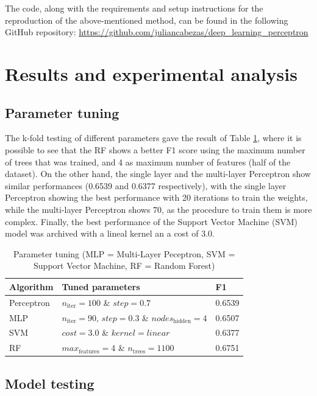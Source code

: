 \documentclass[10pt,twocolumn,letterpaper]{article}
\begin{document}
The code, along with the requirements and setup instructions for the reproduction of the above-mentioned method, can be found in the following GitHub repository: \url{https://github.com/juliancabezas/deep_learning_perceptron} 

\section{Results and experimental analysis}

\subsection{Parameter tuning}

The k-fold testing of different parameters gave the result of Table \ref{table:tuning}, where it is possible to see that the RF shows a better F1 score using the maximum number of trees that was trained, and 4 as maximum number of features (half of the dataset). On the other hand, the single layer and the multi-layer Perceptron show similar performances (0.6539 and 0.6377 respectively), with the single layer Perceptron showing the best performance with 20 iterations to train the weights, while the multi-layer Perceptron shows 70, as the procedure to train them is more complex. Finally, the best performance of the Support Vector Machine (SVM) model was archived with a lineal kernel an a cost of 3.0.

\begin{table}[h]
	\begin{center}
		\begin{tabular}{|p{1.6cm}|p{4.3cm}|p{1cm}|}
			\hline
			Algorithm & Tuned parameters & F1 \\
			\hline\hline
			Perceptron & $n_\mathrm{iter} = 100$ \& $step = 0.7$ & 0.6539 \\
			MLP & $n_\mathrm{iter} = 90$, $step = 0.3$ \& $nodes_\mathrm{hidden} = 4$ & 0.6507 \\
			SVM & $cost = 3.0$ \& $kernel = linear$ & 0.6377 \\
			RF & $max_\mathrm{features} = 4$ \& $n_\mathrm{trees} = 1100$ & 0.6751 \\
			\hline
		\end{tabular}
	\end{center}
	\caption{Parameter tuning (MLP = Multi-Layer Peceptron, SVM = Support Vector Machine, RF = Random Forest)}
	\label{table:tuning}
\end{table}


\subsection{Model testing}
\end{document}
